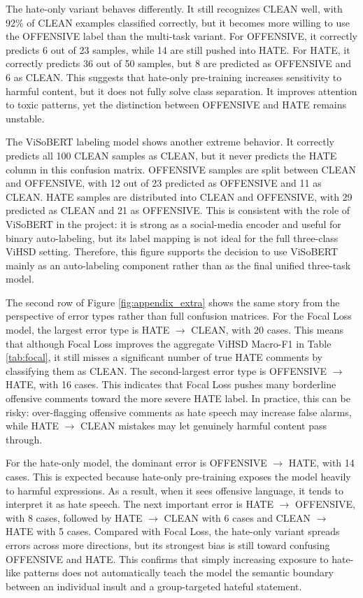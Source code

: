 \documentclass[journal]{IEEEtran}
\newcommand{\mf}{Macro-F1}
\begin{document}
The hate-only variant behaves differently. It still recognizes CLEAN well, with 92\% of CLEAN examples classified correctly, but it becomes more willing to use the OFFENSIVE label than the multi-task variant. For OFFENSIVE, it correctly predicts 6 out of 23 samples, while 14 are still pushed into HATE. For HATE, it correctly predicts 36 out of 50 samples, but 8 are predicted as OFFENSIVE and 6 as CLEAN. This suggests that hate-only pre-training increases sensitivity to harmful content, but it does not fully solve class separation. It improves attention to toxic patterns, yet the distinction between OFFENSIVE and HATE remains unstable.

The ViSoBERT labeling model shows another extreme behavior. It correctly predicts all 100 CLEAN samples as CLEAN, but it never predicts the HATE column in this confusion matrix. OFFENSIVE samples are split between CLEAN and OFFENSIVE, with 12 out of 23 predicted as OFFENSIVE and 11 as CLEAN. HATE samples are distributed into CLEAN and OFFENSIVE, with 29 predicted as CLEAN and 21 as OFFENSIVE. This is consistent with the role of ViSoBERT in the project: it is strong as a social-media encoder and useful for binary auto-labeling, but its label mapping is not ideal for the full three-class ViHSD setting. Therefore, this figure supports the decision to use ViSoBERT mainly as an auto-labeling component rather than as the final unified three-task model.

The second row of Figure \ref{fig:appendix_extra} shows the same story from the perspective of error types rather than full confusion matrices. For the Focal Loss model, the largest error type is HATE $\rightarrow$ CLEAN, with 20 cases. This means that although Focal Loss improves the aggregate ViHSD \mf{} in Table \ref{tab:focal}, it still misses a significant number of true HATE comments by classifying them as CLEAN. The second-largest error type is OFFENSIVE $\rightarrow$ HATE, with 16 cases. This indicates that Focal Loss pushes many borderline offensive comments toward the more severe HATE label. In practice, this can be risky: over-flagging offensive comments as hate speech may increase false alarms, while HATE $\rightarrow$ CLEAN mistakes may let genuinely harmful content pass through.

For the hate-only model, the dominant error is OFFENSIVE $\rightarrow$ HATE, with 14 cases. This is expected because hate-only pre-training exposes the model heavily to harmful expressions. As a result, when it sees offensive language, it tends to interpret it as hate speech. The next important error is HATE $\rightarrow$ OFFENSIVE, with 8 cases, followed by HATE $\rightarrow$ CLEAN with 6 cases and CLEAN $\rightarrow$ HATE with 5 cases. Compared with Focal Loss, the hate-only variant spreads errors across more directions, but its strongest bias is still toward confusing OFFENSIVE and HATE. This confirms that simply increasing exposure to hate-like patterns does not automatically teach the model the semantic boundary between an individual insult and a group-targeted hateful statement.
\end{document}
